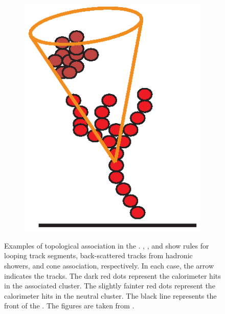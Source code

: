 \begin{figure}[tbph]
\begin{subfigure}[b]{0.3\textwidth}
    \caption{}
    \label{fig:pandoraTopoAssoBackScattered}
  \end{subfigure}
  \begin{subfigure}[b]{0.3\textwidth}
    \includegraphics[width=\textwidth]{pandora/coneAsso}
    \caption{}
    \label{fig:pandoraTopoAssoConeAsso}
  \end{subfigure}
\caption[Topological association in the \pandora.]
{Examples of topological association in the \pandora. , , and  show rules for looping track segments, back-scattered tracks from hadronic showers, and cone association, respectively. In each case, the arrow indicates the tracks. The dark red dots represent the calorimeter hits in the associated cluster. The slightly fainter red dots represent the calorimeter hits in the neutral cluster. The black line represents the front of the \ECAL. The figures are taken from \cite{Marshall:pandoraLC}.}
\label{fig:pandoraTopoAsso}
\end{figure}

